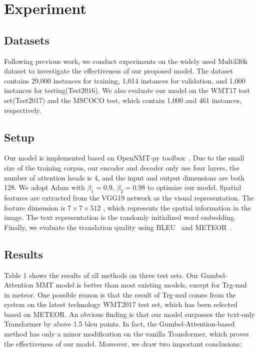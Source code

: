 \documentclass[11pt]{article}
\begin{document}
\section{Experiment}





\subsection{Datasets}
Following previous work, we conduct experiments on the widely used  Multil30k~\citep{DBLP:conf/acl/ElliottFSS16} dataset to investigate the effectiveness of our proposed model. 
The dataset contains 29,000 instances for training, 1,014 instances for validation, and 1,000 instances for testing(Test2016). We also evaluate our model on the WMT17 test set(Test2017) and the MSCOCO test, which contain 1,000 and 461 instances, respectively.

\subsection{Setup}
Our model is implemented based on OpenNMT-py toolbox~\citep{DBLP:conf/acl/KleinKDSR17}. Due to the small size of the training corpus, our encoder and decoder only use four layers, the number of attention heads is 4, and the input and output dimensions are both 128. We adopt Adam with $\beta_1=0.9$, $\beta_2=0.98$ to optimize our model.
Spatial features are extracted from the VGG19 network as the visual representation. The feature dimension is $7 \times 7 \times 512$ , which represents the spatial information in the image. The text representation is the randomly initialized word embedding. 
Finally, we evaluate the translation quality using BLEU~\citep{DBLP:conf/acl/PapineniRWZ02} and METEOR~\citep{DBLP:conf/wmt/DenkowskiL11}.


\subsection{Results}

Table 1 shows the results of all methods on three test sets. Our Gumbel-Attention MMT model is better than most existing models, except for Trg-mul~\citep{DBLP:conf/wmt/CaglayanABGBBMH17} in meteor. One possible reason is that the result of Trg-mul comes from the system on the latest technology WMT2017 test set, which has been selected based on METEOR. An obvious finding is that our model surpasses the text-only Transformer by above 1.5 bleu points. In fact, the Gumbel-Attention-based method has only a minor modification on the vanilla Transformer, which proves the effectiveness of our model. Moreover, we draw two important conclusions:
\end{document}
